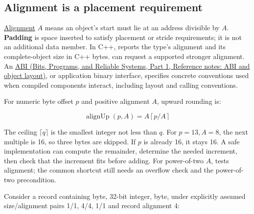 \subsection{Alignment is a placement requirement}\label{01-foundations-i-ch002-alignment-is-a-placement-requirement}

\hypertarget{01-foundations-i-ch002-alignment-is-a-placement-requirement}{}

\hyperref[appendix-a1f7c53b4742]{Alignment} \(A\) means an object's start must lie at an address divisible by \(A\). \textbf{Padding} is space inserted to satisfy placement or stride requirements; it is not an additional data member. In C++,  reports the type's alignment and  its complete-object size in C++ bytes.  can request a supported stronger alignment. An \href{../01-Bits-Programs-and-Reliable-Systems-P01/main.pdf\#appendix-c4ac6bb0fff8}{ABI (Bits, Programs, and Reliable Systems, Part 1, Reference notes: ABI and object layout)}, or application binary interface, specifies concrete conventions used when compiled components interact, including layout and calling conventions.

For numeric byte offset \(p\) and positive alignment \(A\), upward rounding is:

\[
\operatorname{alignUp}(p,A)=A\left\lceil p/A\right\rceil
\]

The ceiling \(\lceil q\rceil\) is the smallest integer not less than \(q\). For \(p=13,A=8\), the next multiple is 16, so three bytes are skipped. If \(p\) is already 16, it stays 16. A safe implementation can compute the remainder, determine the needed increment, then check that the increment fits before adding. For power-of-two \(A\),  tests alignment; the common  shortcut still needs an overflow check and the power-of-two precondition.

Consider a record containing byte, 32-bit integer, byte, under explicitly assumed size/alignment pairs 1/1, 4/4, 1/1 and record alignment 4:

